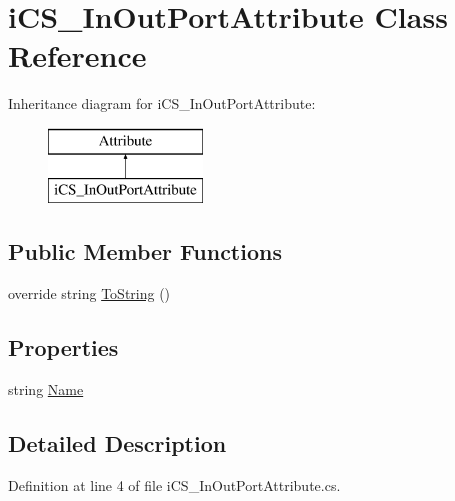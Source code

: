 \hypertarget{classi_c_s___in_out_port_attribute}{\section{i\+C\+S\+\_\+\+In\+Out\+Port\+Attribute Class Reference}
\label{classi_c_s___in_out_port_attribute}
}
Inheritance diagram for i\+C\+S\+\_\+\+In\+Out\+Port\+Attribute\+:\begin{figure}[H]
\begin{center}
\leavevmode
\includegraphics[height=2.000000cm]{classi_c_s___in_out_port_attribute}
\end{center}
\end{figure}
\subsection*{Public Member Functions}
\begin{DoxyCompactItemize}
\item 
override string \hyperlink{classi_c_s___in_out_port_attribute_a44d0f674b2d5322f989021b6ebc17138}{To\+String} ()
\end{DoxyCompactItemize}
\subsection*{Properties}
\begin{DoxyCompactItemize}
\item 
string \hyperlink{classi_c_s___in_out_port_attribute_a551362476186d12337e53831b25742bc}{Name}
\end{DoxyCompactItemize}


\subsection{Detailed Description}


Definition at line 4 of file i\+C\+S\+\_\+\+In\+Out\+Port\+Attribute.\+cs.



